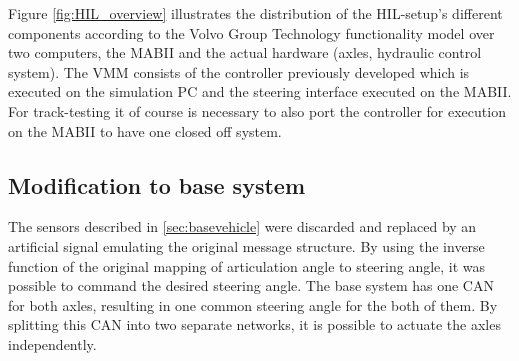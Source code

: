 \documentclass[root.tex]{subfiles}
\begin{document}
 Figure \ref{fig:HIL_overview} illustrates the distribution of the \gls{HIL}-setup's different components according to the Volvo Group Technology functionality model\cite{nilsson2015traffic} over two computers, the \gls{MABII} and the actual hardware (axles, hydraulic control system). The \gls{VMM} consists of the controller previously developed which is executed on the simulation PC and the steering interface executed on the \gls{MABII}. For track-testing it of course is necessary to also port the controller for execution on the \gls{MABII} to have one closed off system. %


\subsection{Modification to base system}
The sensors described in \ref{sec:basevehicle} were discarded and replaced by an artificial signal emulating the original message structure. By using the inverse  function of the original mapping of articulation angle to steering angle, it was possible to command the desired steering angle. The base system has one \gls{CAN} for both axles, resulting in one common steering angle for the both of them. By splitting this \gls{CAN} into two separate networks, it is possible to actuate the axles independently. 
\end{document}
